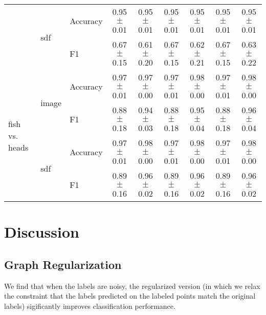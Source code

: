 \documentclass[anon,11pt]{9520} %
\begin{document}
\begin{table}
\begin{center}
\begin{tabular}{l|l|l|cc|cc|cc|}
& \multirow{2}{*}{sdf} & \multirow{1}{*}{Accuracy}& 0.95$\pm$0.01& 0.95$\pm$0.01& 0.95$\pm$0.01& 0.95$\pm$0.01& 0.95$\pm$0.01& 0.95$\pm$0.01\\ 
& & \multirow{1}{*}{F1}& 0.67$\pm$0.15& 0.61$\pm$0.20& 0.67$\pm$0.15& 0.62$\pm$0.21& 0.67$\pm$0.15& 0.63$\pm$0.22\\ \cline{2-9} 

\multirow{4}{*}{fish vs. heads}
& \multirow{2}{*}{image} & \multirow{1}{*}{Accuracy}& 0.97$\pm$0.01& 0.97$\pm$0.00& 0.97$\pm$0.01& 0.98$\pm$0.00& 0.97$\pm$0.01& 0.98$\pm$0.00\\ 
& & \multirow{1}{*}{F1}& 0.88$\pm$0.18& 0.94$\pm$0.03& 0.88$\pm$0.18& 0.95$\pm$0.04& 0.88$\pm$0.18& 0.96$\pm$0.04\\ \cline{2-9} 

& \multirow{2}{*}{sdf} & \multirow{1}{*}{Accuracy}& 0.97$\pm$0.01& 0.98$\pm$0.00& 0.97$\pm$0.01& 0.98$\pm$0.00& 0.97$\pm$0.01& 0.98$\pm$0.00\\ 
& & \multirow{1}{*}{F1}& 0.89$\pm$0.16& 0.96$\pm$0.02& 0.89$\pm$0.16& 0.96$\pm$0.02& 0.89$\pm$0.16& 0.96$\pm$0.02\\ \cline{2-9} 

\end{tabular}
\end{center}
\end{table}


\subsection{}

\section{Discussion}

\subsection{Graph Regularization}

We find that when the labels are noisy, the regularized version (in which we relax the constraint that the labels predicted on the labeled points match the original labels) sigificantly improves classification performance.
\end{document}
